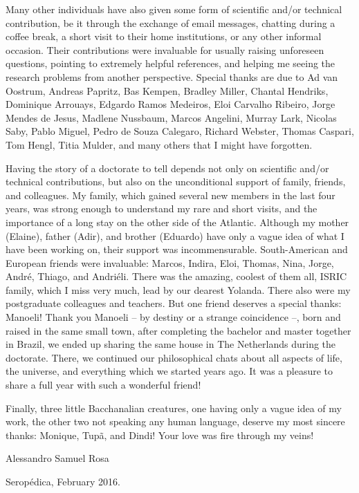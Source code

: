 Many other individuals have also given some form of scientific and/or technical contribution, be it through 
the exchange of email messages, chatting during a coffee break, a short visit to their home institutions, or 
any other informal occasion. Their contributions were invaluable for usually raising unforeseen questions, 
pointing to extremely helpful references, and helping me seeing the research problems from another perspective.
Special thanks are due to Ad van Oostrum, Andreas Papritz, Bas Kempen, Bradley Miller, Chantal Hendriks, 
Dominique Arrouays, Edgardo Ramos Medeiros, Eloi Carvalho Ribeiro, Jorge Mendes de Jesus, Madlene Nussbaum, 
Marcos Angelini, Murray Lark, Nicolas Saby, Pablo Miguel, Pedro de Souza Calegaro, Richard Webster, Thomas 
Caspari, Tom Hengl, Titia Mulder, and many others that I might have forgotten.

Having the story of a doctorate to tell depends not only on scientific and/or technical contributions,
but also on the unconditional support of family, friends, and colleagues. My family, which gained several new 
members in the last four years, was strong enough to understand my rare and short visits, and the importance 
of a long stay on the other side of the Atlantic. Although my mother (Elaine), father (Adir), and brother 
(Eduardo) have only a vague idea of what I have been working on, their support was incommensurable. 
South-American and European friends were invaluable: Marcos, Indira, Eloi, Thomas, Nina, Jorge, André, Thiago, 
and Andriéli. There was the amazing, coolest of them all, ISRIC family, which I miss very much, lead by 
our dearest Yolanda. There also were my postgraduate colleagues and teachers. But one friend deserves a special 
thanks: Manoeli! Thank you Manoeli -- by destiny or a strange coincidence --, born and raised in the same small 
town, after completing the bachelor and master together in Brazil, we ended up sharing the same house in The 
Netherlands during the doctorate. There, we continued our philosophical chats about all aspects of life, the 
universe, and everything which we started years ago. It was a pleasure to share a full year with such a 
wonderful friend!

Finally, three little Bacchanalian creatures, one having only a vague idea of my work, the other two not 
speaking any human language, deserve my most sincere thanks: Monique, Tupã, and Dindi! Your love was fire 
through my veins!

\begin{flushright}
 Alessandro Samuel Rosa
 
 Seropédica, February 2016.
\end{flushright}
